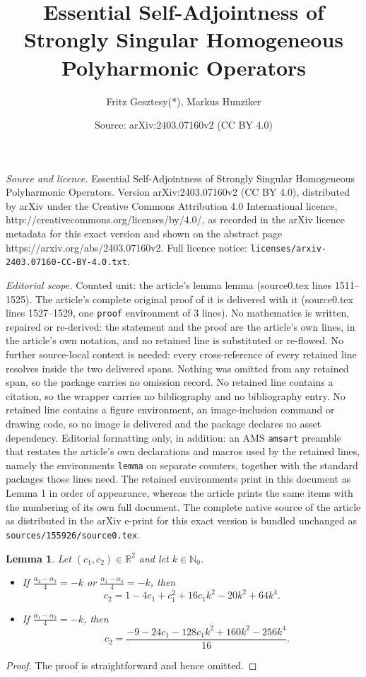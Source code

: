 \documentclass[10pt,a4paper]{amsart}
\title{Essential Self-Adjointness of Strongly Singular Homogeneous Polyharmonic Operators}
\author{Fritz Gesztesy(*), Markus Hunziker}
\date{Source: arXiv:2403.07160v2 (CC BY 4.0)}
\newtheorem{lemma}{Lemma}
\newcommand{\bbN}{{\mathbb{N}}}
\newcommand{\bbR}{{\mathbb{R}}}
\def\d{\displaystyle}
\newcommand{\lb}{\label}
\begin{document}
\maketitle

\noindent\emph{Source and licence.} Essential Self-Adjointness of Strongly Singular Homogeneous Polyharmonic Operators. Version arXiv:2403.07160v2 (CC BY 4.0), distributed by arXiv under the Creative Commons Attribution 4.0 International licence, http://creativecommons.org/licenses/by/4.0/, as recorded in the arXiv licence metadata for this exact version and shown on the abstract page https://arxiv.org/abs/2403.07160v2. Full licence notice: \texttt{licenses/arxiv-2403.07160-CC-BY-4.0.txt}.\par\smallskip

\noindent\textit{Editorial scope.} Counted unit: the article's lemma lemma (source0.tex lines 1511--1525). The article's complete original proof of it is delivered with it (source0.tex lines 1527--1529, one \texttt{proof} environment of 3 lines). No mathematics is written, repaired or re-derived: the statement and the proof are the article's own lines, in the article's own notation, and no retained line is substituted or re-flowed.  No further source-local context is needed: every cross-reference of every retained line resolves inside the two delivered spans.  Nothing was omitted from any retained span, so the package carries no omission record.  No retained line contains a citation, so the wrapper carries no bibliography and no bibliography entry.  No retained line contains a figure environment, an image-inclusion command or drawing code, so no image is delivered and the package declares no asset dependency.  Editorial formatting only, in addition: an AMS \texttt{amsart} preamble that restates the article's own declarations and macros used by the retained lines, namely the environments \texttt{lemma} on separate counters, together with the standard packages those lines need.  The retained environments print in this document as Lemma 1 in order of appearance, whereas the article prints the same items with the numbering of its own full document.  The complete native source of the article as distributed in the arXiv e-print for this exact version is bundled unchanged as \texttt{sources/155926/source0.tex}.
\begin{lemma} \lb{lA.1}
Let $(c_1,c_2)\in \bbR^2$ and let $k\in \bbN_0$.
\begin{itemize}
\item[(a)]
If $\d \frac{\alpha_2-\alpha_3}{4}=-k$ or $\d \frac{\alpha_1-\alpha_4}{4}=-k$, then
\begin{equation}\lb{E:equation of line}
 c_2=1 - 4 c_1 + c_1^2  + 16 c_1 k^2 - 20 k^2  + 64 k^4 .
\end{equation}
\item[(b)]
If $\d \frac{\alpha_1-\alpha_2}{4}=-k$,  then
\begin{equation}\lb{E:equation of parabola}
\quad c_2= \frac{-9 - 24 c_1 - 128 c_1 k^2 + 160 k^2  - 256 k^4}{16} .
\end{equation}
\end{itemize}
\end{lemma}

\begin{proof}
The proof is straightforward and hence omitted.
\end{proof}
\end{document}
